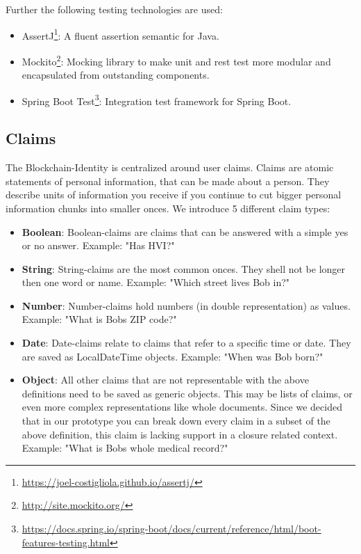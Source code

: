 Further the following testing technologies are used:

\begin{itemize}
\item AssertJ\footnote{\url{https://joel-costigliola.github.io/assertj/}}: A fluent assertion semantic for Java. 
\item Mockito\footnote{\url{http://site.mockito.org/}}: Mocking library to make unit and rest test more modular and encapsulated from outstanding components. 
\item Spring Boot Test\footnote{\url{https://docs.spring.io/spring-boot/docs/current/reference/html/boot-features-testing.html}}: Integration test framework for Spring Boot. 
\end{itemize}

\subsection{Claims}
The Blockchain-Identity is centralized around user claims. Claims are atomic statements of personal information, that can be made about a person. They describe units of information you receive if you continue to cut bigger personal information chunks into smaller onces. We introduce 5 different claim types: 

\begin{itemize}
\item \textbf{Boolean}: Boolean-claims are claims that can be answered with a simple yes or no answer.
Example: "Has HVI?" 
\item \textbf{String}: String-claims are the most common onces. They shell not be longer then one word or name. 
Example: "Which street lives Bob in?"
\item \textbf{Number}: Number-claims hold numbers (in double representation) as values. 
Example: "What is Bobs ZIP code?"
\item \textbf{Date}: Date-claims relate to claims that refer to a specific time or date. They are saved as LocalDateTime objects.
Example: "When was Bob born?"  
\item \textbf{Object}: All other claims that are not representable with the above definitions need to be saved as generic objects. This may be lists of claims, or even more complex representations like whole documents. Since we decided that in our prototype you can break down every claim in a subset of the above definition, this claim is lacking support in a closure related context. 
Example: "What is Bobs whole medical record?"
\end{itemize}

